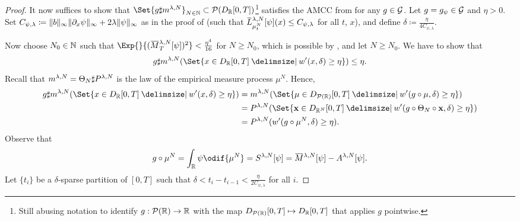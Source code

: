 \begin{proof}
  It now suffices to show that \( \Set{g \sharp \lawmu^{\lambda, N}}_{N\in\bN} \subset \cP(D_{\potspace}[0,T])\)\footnote{Still abusing notation to identify \( g : \mathcal{P}(\mathbb{R}) \to \mathbb{R} \) with the map \( D_{\mathcal{P}(\mathbb{R})}[0,T] \mapsto D_{\mathbb{R}}[0,T] \) that applies \( g \) pointwise.} satisfies the AMCC from  for any \( g \in \mathcal{G} \).
  Let \( g = g_\psi \in \mathcal{G} \) and \( \eta > 0 \).
  Set \( C_{\psi, \lambda} \coloneqq \lVert b\rVert_\infty \lVert\partial_x \psi\rVert_\infty + 2\lambda \lVert\psi\rVert_\infty \) as in the proof of  (such that \( \ol{L}_{\mu_t^N}^{\lambda,N} [\psi] (x) \leq C_{\psi, \lambda} \) for all \( t \), \( x \)), and define \(\delta \coloneqq \frac{\eta}{4C_{\psi, \lambda}}\).

  Now choose \( N_0 \in \mathbb{N} \) such that \(\Exp{}{ ( \ol{M}_T^{\lambda, N}[\psi] )^2 } < \frac{\eta^4}{16}\) for \( N \geq N_0 \), which is possible by , and let \(N \geq N_0\).
  We have to show that
  \begin{equation}
    g \sharp \lawmu^{\lambda, N}(\Set{ x \in D_{\potspace}[0,T] \given w'(x,\delta) \geq \eta }) \leq \eta.
  \end{equation}
  Recall that \(m^{\lambda, N} = \Theta_N \sharp P^{\lambda, N}\) is the law of the empirical measure process \(\mu^N\).
  Hence,
  \begin{equation}
    \begin{split}
      g \sharp \lawmu^{\lambda, N}(\Set{ x \in D_{\potspace}[0,T] \given w'(x,\delta) \geq \eta })
       & = \lawmu^{\lambda, N}(\Set{ \mu \in D_{\cP(\potspace)}[0,T] \given w'(g \circ \mu,\delta) \geq \eta })              \\
       & = P^{\lambda, N}(\Set{ \bm{x} \in D_{\potspace^N}[0,T] \given w'(g \circ \Theta_N \circ \bm{x},\delta) \geq \eta }) \\
       & = P^{\lambda, N}( w'(g \circ \mu^N,\delta) \geq \eta ).
    \end{split}
  \end{equation}
  Observe that
  \begin{equation}
    g \circ \mu^N = \int_\potspace \psi \odif{\mu^N} = S^{\lambda, N}[\psi] = \ol{M}^{\lambda, N}[\psi] - A^{\lambda, N}[\psi].
  \end{equation}
  Let \( \{t_i\} \) be a \( \delta \)-sparse partition of \( [0,T] \) such that \(\delta < t_i - t_{i-1} < \frac{\eta}{2C_{\psi, \lambda}}\) for all \( i \).

\end{proof}
